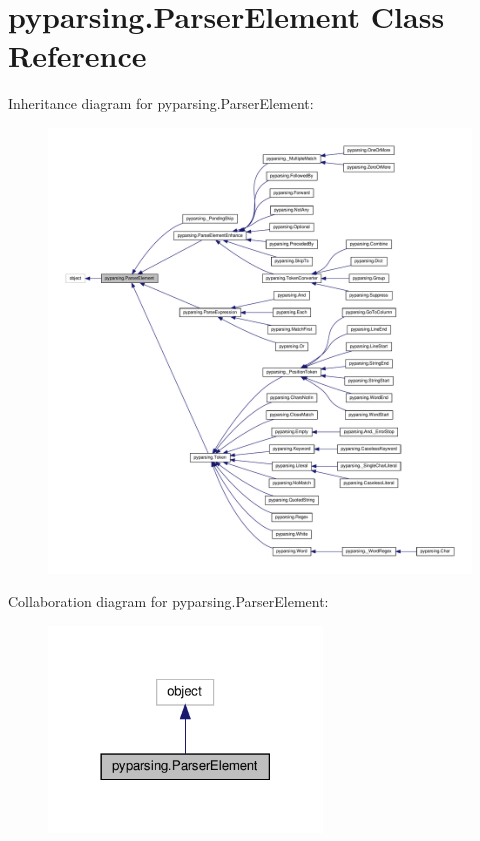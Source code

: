 \hypertarget{classpyparsing_1_1ParserElement}{}\section{pyparsing.\+Parser\+Element Class Reference}
\label{classpyparsing_1_1ParserElement}


Inheritance diagram for pyparsing.\+Parser\+Element\+:
\nopagebreak
\begin{figure}[H]
\begin{center}
\leavevmode
\includegraphics[width=350pt]{classpyparsing_1_1ParserElement__inherit__graph}
\end{center}
\end{figure}


Collaboration diagram for pyparsing.\+Parser\+Element\+:
\nopagebreak
\begin{figure}[H]
\begin{center}
\leavevmode
\includegraphics[width=206pt]{classpyparsing_1_1ParserElement__coll__graph}
\end{center}
\end{figure}
